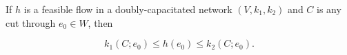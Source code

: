If $h$ is a feasible flow in a doubly-capacitated network $(V, k_1, k_2)$ and $C$ is any cut through $e_0 \in W$, then

$$k_1(C; e_0) \leq h(e_0) \leq k_2(C; e_0).$$
